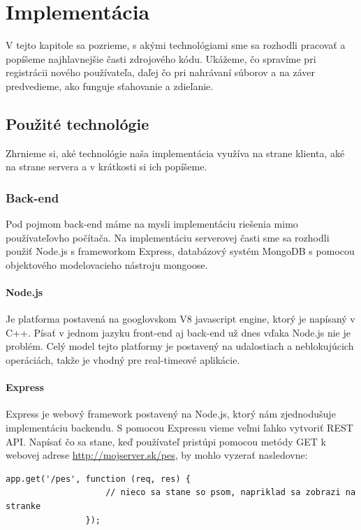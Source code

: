 \chapter{Implementácia}
	V tejto kapitole sa pozrieme, s akými technológiami sme sa rozhodli pracovať a popíšeme najhlavnejšie časti zdrojového kódu. Ukážeme, čo spravíme pri registrácii nového používateľa, daľej čo pri nahrávaní súborov a na záver predvedieme, ako funguje sťahovanie a zdieľanie.
	
\section{Použité technológie}
	Zhrnieme si, aké technológie naša implementácia využíva na strane klienta, aké na strane servera a v krátkosti si ich popíšeme.
	\subsection{Back-end}
		Pod pojmom back-end máme na mysli implementáciu riešenia mimo používateľovho počítača. Na implementáciu serverovej časti sme sa rozhodli použiť Node.js s frameworkom Express, databázový systém MongoDB s pomocou objektového modelovacieho nástroju mongoose.
		\\
		\subsubsection{Node.js}
			Je platforma postavená na googlovskom V8 javascript engine, ktorý je napísaný v C++. Písať v jednom jazyku front-end aj back-end už dnes vďaka Node.js nie je problém. Celý model tejto platformy je postavený na udalostiach a neblokujúcich operáciách, takže je vhodný pre real-timeové aplikácie.
		\subsubsection{Express}
			Express je webový framework postavený na Node.js, ktorý nám zjednodušuje implementáciu backendu. S pomocou Expressu vieme veľmi ľahko vytvoriť REST API. Napísať čo sa stane, keď používateľ pristúpi pomocou metódy GET k webovej adrese \url{http://mojserver.sk/pes}, by mohlo vyzerať nasledovne:
			\medskip
			\begin{lstlisting}[caption=Express routing]
				app.get('/pes', function (req, res) {
					// nieco sa stane so psom, napriklad sa zobrazi na stranke
				});			
			\end{lstlisting}
